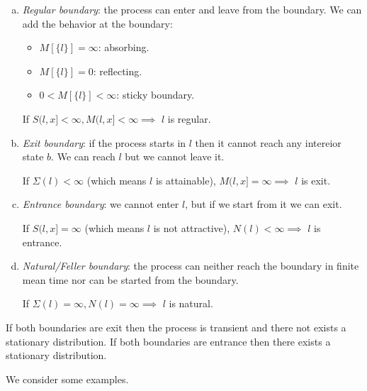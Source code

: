 \documentclass[12pt]{report}
\begin{document}
\begin{enumerate}[a)]
	\item \textit{Regular boundary}: the process can enter and leave from the boundary. We can add the behavior at the boundary:
	\begin{itemize}
		\item $M[\{l\}]=\infty$: absorbing.
		\item $M[\{l\}]=0$: reflecting.
		\item $0<M[\{l\}]<\infty$: sticky boundary.
	\end{itemize}
	\begin{proposition}
		If $S(l,x]<\infty,M(l,x]<\infty\implies$ $l$ is regular.
	\end{proposition}
	\item \textit{Exit boundary}: if the process starts in $l$ then it cannot reach any intereior state $b$. We can reach $l$ but we cannot leave it.
	\begin{proposition}
		If $\Sigma(l)<\infty$ (which means $l$ is attainable), $M(l,x]=\infty\implies$ $l$ is exit.
	\end{proposition}
	\item \textit{Entrance boundary}: we cannot enter $l$, but if we start from it we can exit.
	\begin{proposition}
		If $S(l,x]=\infty$ (which means $l$ is not attractive), $N(l)<\infty\implies$ $l$ is entrance.
	\end{proposition}
	\item \textit{Natural/Feller boundary}: the process can neither reach the boundary in finite mean time nor can be started from the boundary.
	\begin{proposition}
		If $\Sigma(l)=\infty,N(l)=\infty\implies$ $l$ is natural.
	\end{proposition}
\end{enumerate}
\begin{remark}
	If both boundaries are exit then the process is transient and there not exists a stationary distribution. If both boundaries are entrance then there exists a stationary distribution.
\end{remark}
We consider some examples.
\end{document}
